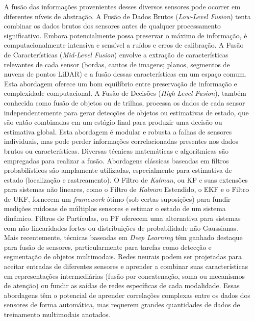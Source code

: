 A fusão das informações provenientes desses diversos sensores pode ocorrer em diferentes níveis de abstração. A Fusão de Dados Brutos (\textit{Low-Level Fusion}) tenta combinar os dados brutos dos sensores antes de qualquer processamento significativo. Embora potencialmente possa preservar o máximo de informação, é computacionalmente intensiva e sensível a ruídos e erros de calibração. A Fusão de Características (\textit{Mid-Level Fusion}) envolve a extração de características relevantes de cada sensor (bordas, cantos de imagens; planos, segmentos de nuvens de pontos LiDAR) e a fusão dessas características em um espaço comum. Esta abordagem oferece um bom equilíbrio entre preservação de informação e complexidade computacional. A Fusão de Decisões (\textit{High-Level Fusion}), também conhecida como fusão de objetos ou de trilhas, processa os dados de cada sensor independentemente para gerar detecções de objetos ou estimativas de estado, que são então combinadas em um estágio final para produzir uma decisão ou estimativa global. Esta abordagem é modular e robusta a falhas de sensores individuais, mas pode perder informações correlacionadas presentes nos dados brutos ou características.
Diversas técnicas matemáticas e algorítmicas são empregadas para realizar a fusão. Abordagens clássicas baseadas em filtros probabilísticos são amplamente utilizadas, especialmente para estimativa de estado (localização e rastreamento). O Filtro de \textit{Kalman}, ou \ac{KF} e suas extensões para sistemas não lineares, como o Filtro de \textit{Kalman} Estendido, o \ac{EKF} e o Filtro de \ac{UKF}, fornecem um \textit{framework} ótimo (sob certas suposições) para fundir medições ruidosas de múltiplos sensores e estimar o estado de um sistema dinâmico. Filtros de Partículas, ou \ac{PF} oferecem uma alternativa para sistemas com não-linearidades fortes ou distribuições de probabilidade não-Gaussianas. Mais recentemente, técnicas baseadas em \textit{Deep Learning} têm ganhado destaque para fusão de sensores, particularmente para tarefas como detecção e segmentação de objetos multimodais. Redes neurais podem ser projetadas para aceitar entradas de diferentes sensores e aprender a combinar suas características em representações intermediárias (fusão por concatenação, soma ou mecanismos de atenção) ou fundir as saídas de redes específicas de cada modalidade. Essas abordagens têm o potencial de aprender correlações complexas entre os dados dos sensores de forma automática, mas requerem grandes quantidades de dados de treinamento multimodais anotados.
